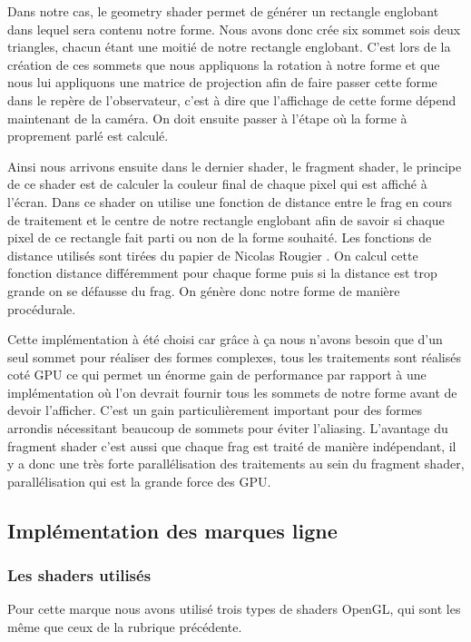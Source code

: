 \documentclass[12pt]{article}
\begin{document}
Dans notre cas, le geometry shader permet de générer un rectangle englobant dans lequel sera contenu notre forme. Nous avons donc crée six sommet sois deux triangles, chacun étant une moitié de notre rectangle englobant. C'est lors de la création de ces sommets que nous appliquons la rotation à notre forme et que nous lui appliquons une matrice de projection afin de faire passer cette forme dans le repère de l'observateur, c'est à dire que l'affichage de cette forme dépend maintenant de la caméra. On doit ensuite passer à l'étape où la forme à proprement parlé est calculé.

Ainsi nous arrivons ensuite dans le dernier shader, le fragment shader, le principe de ce shader est de calculer la couleur final de chaque pixel qui est affiché à l'écran. Dans ce shader on utilise une fonction de distance entre le \gls{frag} en cours de traitement et le centre de notre rectangle englobant afin de savoir si chaque pixel de ce rectangle fait parti ou non de la forme souhaité. Les fonctions de distance utilisés sont tirées du papier de Nicolas Rougier \cite{Rougier}. On calcul cette fonction distance différemment pour chaque forme puis si la distance est trop grande on se défausse du \gls{frag}. On génère donc notre forme de manière procédurale.

Cette implémentation à été choisi car grâce à ça nous n'avons besoin que d'un seul sommet pour réaliser des formes complexes, tous les traitements sont réalisés coté GPU ce qui permet un énorme gain de performance par rapport à une implémentation où l'on devrait fournir tous les sommets de notre forme avant de devoir l'afficher. C'est un gain particulièrement important pour des formes arrondis nécessitant beaucoup de sommets pour éviter l'aliasing.
L'avantage du fragment shader c'est aussi que chaque \gls{frag} est traité de manière indépendant, il y a donc une très forte parallélisation des traitements au sein du fragment shader, parallélisation qui est la grande force des GPU.

\subsection{Implémentation des marques ligne}
\subsubsection{Les shaders utilisés}
Pour cette marque nous avons utilisé trois types de shaders OpenGL, qui sont les même que ceux de la rubrique précédente.
\end{document}
